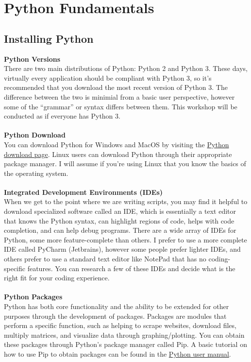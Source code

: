 \documentclass[a4paper,11pt]{article}
\begin{document}
\pagebreak

\section{Python Fundamentals}
\subsection{Installing Python}
\textbf{Python Versions} \\
There are two main distributions of Python: Python 2 and Python 3.  These days, virtually every application should be
compliant with Python 3, so it's recommended that you download the most recent version of Python 3.  The difference
between the two is minimial from a basic user perspective, however some of the ``grammar'' or syntax differs
between them.  This workshop will be conducted as if everyone has Python 3. \\
\\
\textbf{Python Download} \\
You can download Python for Windows and MacOS by visiting the \href{https://www.python.org/downloads}{Python download page}.
Linux users can download Python through their appropriate package manager.  I will assume if you're using Linux that you
know the basics of the operating system.\\
\\
\textbf{Integrated Development Environments (IDEs)} \\
When we get to the point where we are writing scripts, you may find it helpful to download specialized software called an
IDE, which is essentially a text editor that knows the Python syntax, can highlight regions of code, helps with code
completion, and can help debug programs.  There are a wide array of IDEs for Python, some more feature-complete than others.  
I prefer to use a
more complete IDE called PyCharm (Jetbrains),  however some people prefer lighter IDEs, and others prefer to use a standard
text editor like NotePad that has no coding-specific features.  You can research a few of these IDEs and decide what is
the right fit for your coding experience. \\
\\
\textbf{Python Packages} \\
Python has both core functionality and the ability to be extended for other purposes through the development of packages.
Packages are modules that perform a specific function, such as helping to scrape websites, download files, multiply matrices,
and visualize data through graphing/plotting.  You can obtain these packages through Python's package manager called Pip.
A basic tutorial on how to use Pip to obtain packages can be found in the \href{https://packaging.python.org/tutorials/installing-packages/}{Python user manual}.
\end{document}
